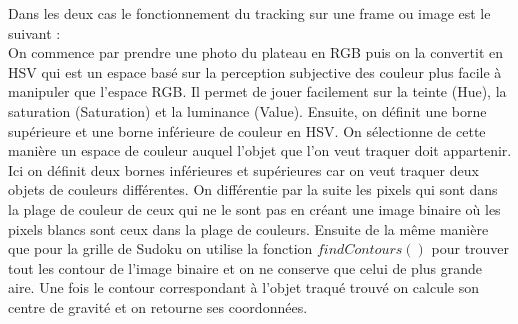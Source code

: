 \documentclass[12pt]{article}
\begin{document}
\begin{figure}
\end{figure}
Dans les deux cas le fonctionnement du tracking sur une frame ou image est le suivant :\\
On commence par prendre une photo du plateau en RGB puis on la convertit en HSV qui est un espace basé sur la perception subjective des couleur plus facile à manipuler que l'espace RGB. Il permet de jouer facilement sur la teinte (Hue), la saturation (Saturation) et la luminance (Value). Ensuite, on définit une borne supérieure et une borne inférieure de couleur en HSV. On sélectionne de cette manière un espace de couleur auquel l'objet que l'on veut traquer doit appartenir. Ici on définit deux bornes inférieures et supérieures car on veut traquer deux objets de couleurs différentes. On différentie par la suite les pixels qui sont dans la plage de couleur de ceux qui ne le sont pas en créant une image binaire où les pixels blancs sont ceux dans la plage de couleurs. Ensuite de la même manière que pour la grille de Sudoku on utilise la fonction $findContours()$ pour trouver tout les contour de l'image binaire et on ne conserve que celui de plus grande aire. Une fois le contour correspondant à l'objet traqué trouvé on calcule son centre de gravité et on retourne ses coordonnées.\\
\end{document}
